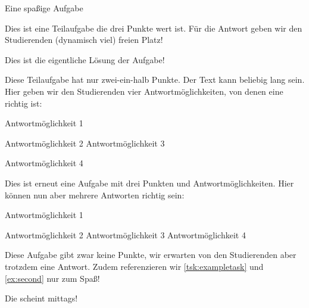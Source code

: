 \begin{Exercise}{Eine spaßige Aufgabe}
\begin{tasks}
    Dies ist eine Teilaufgabe die drei Punkte wert ist. Für die Antwort geben wir den Studierenden (dynamisch viel) freien Platz!
   \VerticalSpace
   \begin{solution}
      Dies ist die eigentliche Lösung der Aufgabe!
   \end{solution}
    \label{tsk:exampletask}Diese Teilaufgabe hat nur zwei-ein-halb Punkte. Der Text kann beliebig lang sein. Hier geben wir den Studierenden vier Antwortmöglichkeiten, von denen eine richtig ist:
   \begin{radioboxes}
      \item Antwortmöglichkeit 1
      \item Antwortmöglichkeit 2
      \correct Antwortmöglichkeit 3
      \item Antwortmöglichkeit 4
   \end{radioboxes}
    Dies ist erneut eine Aufgabe mit drei Punkten und Antwortmöglichkeiten. Hier können nun aber mehrere Antworten richtig sein:
   \begin{checkboxes}
      \correct Antwortmöglichkeit 1
      \item    Antwortmöglichkeit 2
      \correct Antwortmöglichkeit 3
      \correct Antwortmöglichkeit 4
   \end{checkboxes}
    Diese Aufgabe gibt zwar keine Punkte, wir erwarten von den Studierenden aber trotzdem eine Antwort. Zudem referenzieren wir \autoref{tsk:exampletask} und \autoref{ex:second} nur zum Spaß!

   Die  scheint mittags!
   \qquad\strut
\end{tasks}
\end{Exercise}